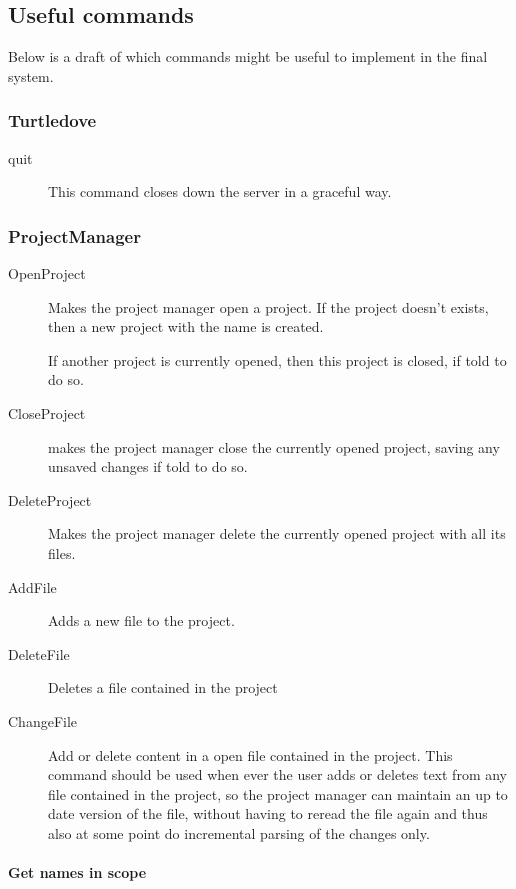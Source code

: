 \subsection*{Useful commands}

 Below is a draft of which commands might be useful to implement in the final system. 

\subsubsection*{Turtledove}

\begin{description}
\item[quit] This command closes down the server in a graceful way.
\end{description}

\subsubsection*{ProjectManager }

\begin{description}
\item[OpenProject] Makes the project manager open a project. If the
  project doesn't exists, then a new project with the name is created.

  If another project is currently opened, then this project is closed, if told
  to do so.
\item[CloseProject] makes the project manager close the currently opened project,
  saving any unsaved changes if told to do so. 
\item[DeleteProject] Makes the project manager delete the currently opened project
  with all its files.
\item[AddFile] Adds a new file to the project.
\item[DeleteFile] Deletes a file contained in the project
\item[ChangeFile] Add or delete content in a open file contained in the
  project. This command should be used when ever the user adds or deletes text
  from any file contained in the project, so the project manager can maintain an
  up to date version of the file, without having to reread the file again and
  thus also at some point do incremental parsing of the changes only.
\end{description}


\paragraph{Get names in scope}

